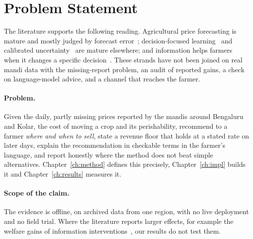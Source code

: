 \section{Problem Statement}
\label{sec:problem}

The literature supports the following reading. Agricultural price forecasting is mature and mostly judged by forecast error~\cite{wu2026}; decision-focused learning~\cite{elmachtoub2022,mandi2024} and calibrated uncertainty~\cite{gibbs2021,angelopoulos2023} are mature elsewhere; and information helps farmers when it changes a specific decision~\cite{jensen2007,aker2010,fafchamps2012}. These strands have not been joined on real mandi data with the missing-report problem, an audit of reported gains, a check on language-model advice, and a channel that reaches the farmer.

\paragraph{Problem.} Given the daily, partly missing prices reported by the mandis around Bengaluru and Kolar, the cost of moving a crop and its perishability, recommend to a farmer \emph{where and when to sell}, state a revenue floor that holds at a stated rate on later days, explain the recommendation in checkable terms in the farmer's language, and report honestly where the method does not beat simple alternatives. Chapter~\ref{ch:method} defines this precisely, Chapter~\ref{ch:impl} builds it and Chapter~\ref{ch:results} measures it.

\paragraph{Scope of the claim.} The evidence is offline, on archived data from one region, with no live deployment and no field trial. Where the literature reports larger effects, for example the welfare gains of information interventions~\cite{jensen2007,aker2010}, our results do not test them.
